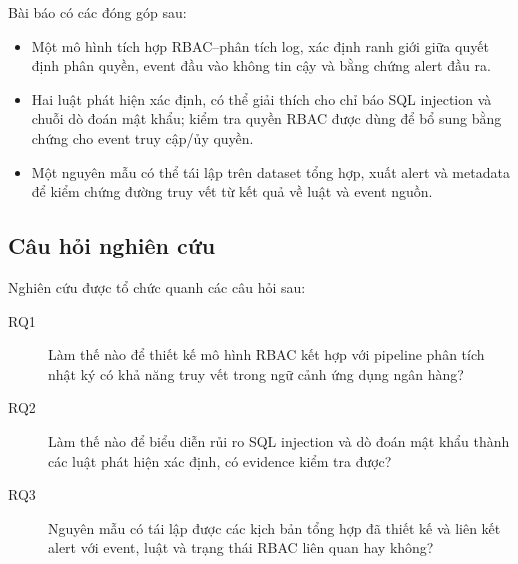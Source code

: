 Bài báo có các đóng góp sau:

\begin{itemize}
  \item Một mô hình tích hợp RBAC--phân tích log, xác định ranh giới giữa quyết
  định phân quyền, event đầu vào không tin cậy và bằng chứng alert đầu ra.
  \item Hai luật phát hiện xác định, có thể giải thích cho chỉ báo SQL injection
  và chuỗi dò đoán mật khẩu; kiểm tra quyền RBAC được dùng để bổ sung bằng chứng
  cho event truy cập/ủy quyền.
  \item Một nguyên mẫu có thể tái lập trên dataset tổng hợp, xuất alert và
  metadata để kiểm chứng đường truy vết từ kết quả về luật và event nguồn.
\end{itemize}

\subsection{Câu hỏi nghiên cứu}
\label{subsec:research-questions}

Nghiên cứu được tổ chức quanh các câu hỏi sau:

\begin{description}
  \item[RQ1] Làm thế nào để thiết kế mô hình RBAC kết hợp với pipeline phân tích
  nhật ký có khả năng truy vết trong ngữ cảnh ứng dụng ngân hàng?
  \item[RQ2] Làm thế nào để biểu diễn rủi ro SQL injection và dò đoán mật khẩu
  thành các luật phát hiện xác định, có evidence kiểm tra được?
  \item[RQ3] Nguyên mẫu có tái lập được các kịch bản tổng hợp đã thiết kế và liên
  kết alert với event, luật và trạng thái RBAC liên quan hay không?
\end{description}
